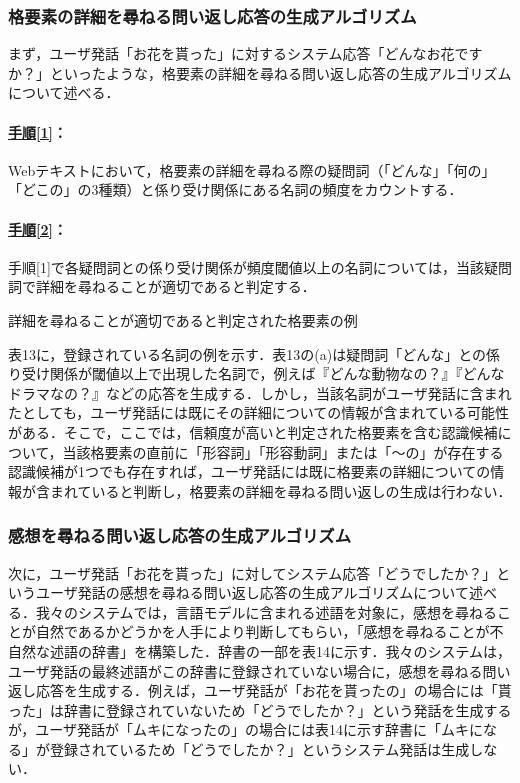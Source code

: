 \documentclass[japanese]{jnlp_1.4}
\begin{document}
\subsubsection{格要素の詳細を尋ねる問い返し応答の生成アルゴリズム}

まず，ユーザ発話「お花を貰った」に対するシステム応答「どんなお花ですか？」といったような，格要素の詳細を尋ねる問い返し応答の生成アルゴリズムについて述べる．


\paragraph{\underline{手順[1]}：}Webテキスト\cite{no38}において，格要素の詳細を尋ねる際の疑問詞（「どんな」「何の」「どこの」の3種類）と係り受け関係にある名詞の頻度をカウントする．


\paragraph{\underline{手順[2]}：}手順[1]で各疑問詞との係り受け関係が頻度閾値以上の名詞については，当該疑問詞で詳細を尋ねることが適切であると判定する．

\begin{table}[b]
\caption{詳細を尋ねることが適切であると判定された格要素の例}
\label{table:13}

\end{table}


表13に，登録されている名詞の例を示す．表13の(a)は疑問詞「どんな」との係り受け関係が閾値以上で出現した名詞で，例えば『どんな動物なの？』『どんなドラマなの？』などの応答を生成する．しかし，当該名詞がユーザ発話に含まれたとしても，ユーザ発話には既にその詳細についての情報が含まれている可能性がある．そこで，ここでは，信頼度が高いと判定された格要素を含む認識候補について，当該格要素の直前に「形容詞」「形容動詞」または「〜の」が存在する認識候補が1つでも存在すれば，ユーザ発話には既に格要素の詳細についての情報が含まれていると判断し，格要素の詳細を尋ねる問い返しの生成は行わない．
 

\subsubsection{感想を尋ねる問い返し応答の生成アルゴリズム}

次に，ユーザ発話「お花を貰った」に対してシステム応答「どうでしたか？」というユーザ発話の感想を尋ねる問い返し応答の生成アルゴリズムについて述べる．我々のシステムでは，言語モデルに含まれる述語を対象に，感想を尋ねることが自然であるかどうかを人手により判断してもらい，「感想を尋ねることが不自然な述語の辞書」を構築した．辞書の一部を表14に示す．我々のシステムは，ユーザ発話の最終述語がこの辞書に登録されていない場合に，感想を尋ねる問い返し応答を生成する．例えば，ユーザ発話が「お花を貰ったの」の場合には「貰った」は辞書に登録されていないため「どうでしたか？」という発話を生成するが，ユーザ発話が「ムキになったの」の場合には表14に示す辞書に「ムキになる」が登録されているため「どうでしたか？」というシステム発話は生成しない．
\end{document}
